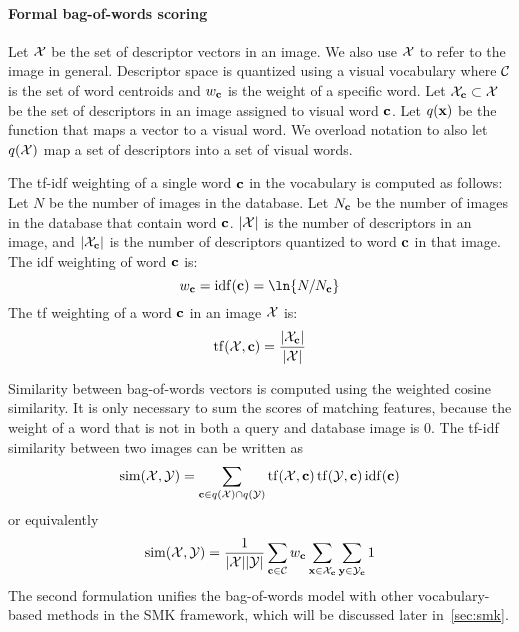         \paragraph{Formal bag-of-words scoring}
            Let $\mathcal{X}$ be the set of descriptor vectors in an image. We also use $\mathcal{X}$ to refer to the image in
            general. Descriptor space is quantized using a visual vocabulary where $\mathcal{C}$ is the set of word
            centroids and $w_{\mathbf{c}}$ is the weight of a specific word. Let $\mathcal{X}_{\mathbf{c}} \subset \mathcal{X}$ be the set of descriptors
            in an image assigned to visual word $\mathbf{c}$. Let $q(\mathbf{x})$ be the function that maps a vector to a visual
            word. We overload notation to also let $q(\mathcal{X})$ map a set of descriptors into a set of visual words.

            The tf-idf weighting of a single word $\mathbf{c}$ in the vocabulary is computed as follows: Let $N$ be the
            number of images in the database. Let $N_{\mathbf{c}}$ be the number of images in the database that contain word
            $\mathbf{c}$. $|\mathcal{X}|$ is the number of descriptors in an image, and $|\mathcal{X}_{\mathbf{c}}|$ is the number of
            descriptors quantized to word $\mathbf{c}$ in that image. The idf weighting of word $\mathbf{c}$ is:
            \begin{equation}
                w_\c = \opname{idf}(\c) = \ln{N/N_\c}
            \end{equation}
            The tf weighting of a word $\mathbf{c}$ in an image $\mathcal{X}$ is:
            \begin{equation}
                \operatorname{tf}(\mathcal{X}, \mathbf{c}) = \frac{|\mathcal{X}_{\mathbf{c}}|}{|\mathcal{X}|}
            \end{equation}

            Similarity between bag-of-words vectors is computed using the weighted cosine similarity. It is only
            necessary to sum the scores of matching features, because the weight of a word that is not in both a
            query and database image is $0$. The tf-idf similarity between two images can be written as
            \begin{equation}
                \operatorname{sim}(\mathcal{X}, \mathcal{Y}) = \sum_{\mathbf{c} \in q(\mathcal{X}) \cap q(\mathcal{Y})} \operatorname{tf}(\mathcal{X}, \mathbf{c}) \operatorname{tf}(\mathcal{Y}, \mathbf{c}) \operatorname{idf}(\mathbf{c}) 
            \end{equation}
            or equivalently
            \begin{equation}
                \operatorname{sim}(\mathcal{X}, \mathcal{Y}) = \frac{1}{|\mathcal{X}||\mathcal{Y}|}\sum_{\mathbf{c} \in \mathcal{C}} w_{\mathbf{c}} \sum_{\mathbf{x} \in \mathcal{X}_{\mathbf{c}}} \sum_{\mathbf{y} \in \mathcal{Y}_{\mathbf{c}}} 1
            \end{equation}
            The second formulation unifies the bag-of-words model with other vocabulary-based methods in the SMK
            framework, which will be discussed later in~\cref{sec:smk}.

